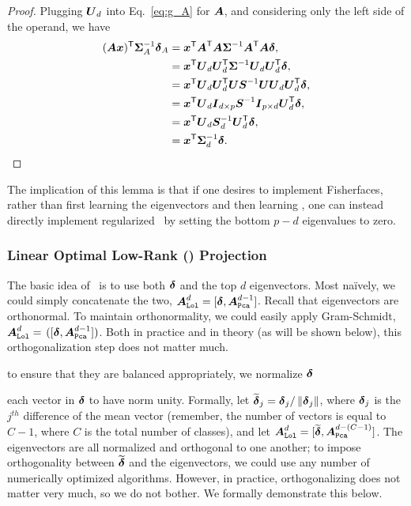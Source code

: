 \documentclass[10pt]{article}
\begin{document}
\begin{proof}
Plugging $\bU_d$ into Eq.~\eqref{eq:g_A} for $\bA$, and considering only the left side of the operand, we have
\begin{align*}
(\bA \bx)\T \bSig^{-1}_A \bdel_A &= \bx\T \bA\T \bA \bSig^{-1} \bA\T \bA \bdel,
\\&= \bx\T  \bU_d\bU_d\T \bSig^{-1} \bU_d\bU_d\T \bdel,
\\&= \bx\T  \bU_d \bU_d\T \bU \bS^{-1} \bU \bU_d\bU_d\T \bdel,
\\&= \bx\T  \bU_d \bI_{d \times p} \bS^{-1} \bI_{p \times d} \bU_d\T \bdel,
\\&= \bx\T  \bU_d \bS^{-1}_d  \bU_d\T \bdel ,
\\&= \bx\T  \bSig^{-1}_d  \bdel.
\end{align*}
\end{proof}

The implication of this lemma is that if one desires to implement Fisherfaces, rather than first learning the eigenvectors and then learning \Lda, one can instead directly implement regularized \Lda~by setting the bottom $p-d$ eigenvalues to zero.




\subsubsection{Linear Optimal Low-Rank (\Lol) Projection}


The basic idea of \Lol~is to use both $\bdel$ and the top $d$ eigenvectors.  Most na\"ively, we could simply concatenate the two, $\bA_{\Lol}^d=[\bdel,\bA_{\Pca}^{d-1}]$.  
Recall that eigenvectors are orthonormal.  To maintain orthonormality, we could easily apply Gram-Schmidt,  $\bA_{\Lol}^d=$ $([\bdel, \bA_{\Pca}^{d-1}])$.
Both in practice and in theory (as will be shown below), this orthogonalization step does not matter much.

to ensure that they are balanced appropriately, we normalize $\bdel$

each vector in $\bdel$ to have norm unity.  Formally, let $\mt{\bdel}_j = \bdel_j / \norm{\bdel_j}$, where $\bdel_j$ is the $j^{th}$ difference of the mean vector (remember, the number of vectors is equal to $C-1$, where $C$ is the total number of classes), and let  $\bA_{\Lol}^d=[\mt{\bdel}, \bA_{\Pca}^{d-(C-1)}]$.  
The eigenvectors are all normalized and orthogonal to one another; to impose orthogonality between $\mt{\bdel}$ and the eigenvectors, we could use any number of numerically optimized algorithms.  However, in practice, orthogonalizing does not matter very much, so we do not bother. We formally demonstrate this below.
\end{document}
